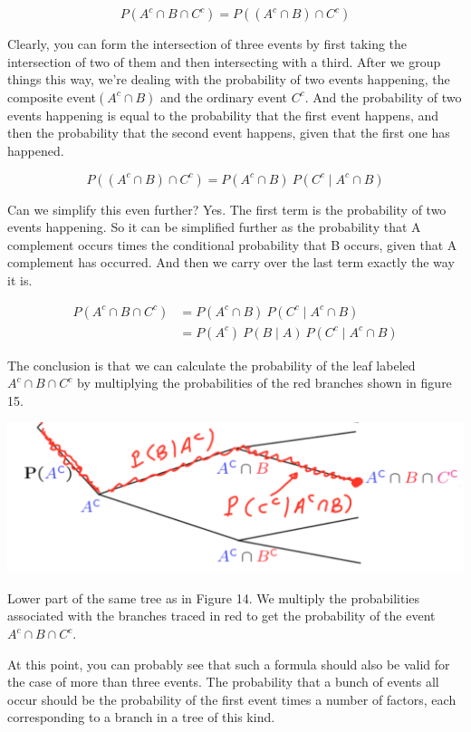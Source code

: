 \documentclass{tufte-handout}
\begin{document}
$$
P(A^c \cap B \cap C^c) = P\left( (A^c \cap B) \cap C^c \right)
$$


Clearly, you can form the intersection of three events by first taking the intersection of two of them and
then intersecting with a third. After we group things this way, we're dealing with the probability of two
events happening, the composite event$(A^c \cap B)$ and the ordinary event $C^c$. And the probability of two events
happening is equal to the probability that the first event happens, and then the probability that the
second event happens, given that the first one has happened.

$$
P\left( (A^c \cap B) \cap C^c \right) = P (A^c \cap B) \  P(C^c \mid A^c \cap B)
$$


Can we simplify this even further? Yes. The first term is the probability of two events happening. So it
can be simplified further as the probability that A complement occurs times the conditional probability
that B occurs, given that A complement has occurred. And then we carry over the last term exactly the
way it is.

\begin{align*}
P( A^c \cap B \cap C^c ) &= P (A^c \cap B) \  P(C^c \mid A^c \cap B) \\
&= P(A^c) \ P(B \mid A) \ P(C^c \mid A^c \cap B) 
\end{align*}


The conclusion is that we can calculate the probability of the leaf labeled $A^c \cap B \cap C^c$ by multiplying 
the probabilities of the red branches shown in figure 15.
\begin{marginfigure}
  \includegraphics{LowerHalfTree}
  \caption{Lower part of the same tree as in Figure 14. We multiply the probabilities associated with the branches traced in red to get the probability of the event $A^c \cap B \cap C^c$.}
\end{marginfigure}

\vspace{0.2cm}
At this point, you can probably see that such a formula should also be valid for the case of
more than three events. The probability that a bunch of events all occur should be the probability of the
first event times a number of factors, each corresponding to a branch in a tree of this kind.
\end{document}
